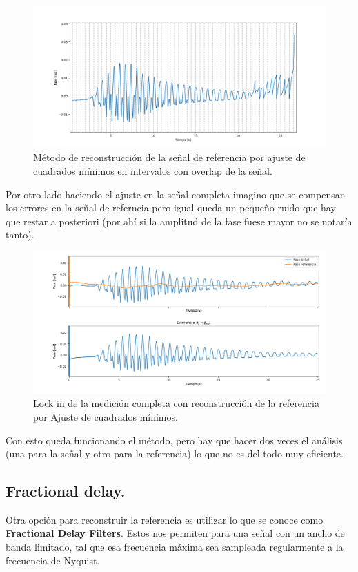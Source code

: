 \begin{figure}[th!]
	\centering
	\includegraphics[width=0.857\linewidth]{Figures/09_06_2025/Lock_in_ajuste_intervalos_con_overlap}
	\caption{Método de reconstrucción de la señal de referencia por ajuste de cuadrados mínimos en intervalos con overlap de la señal.}
	\label{fig:lockinajusteintervalosconoverlap}
\end{figure}

Por otro lado haciendo el ajuste en la señal completa imagino que se compensan los errores en la señal de referncia pero igual queda un pequeño ruido que hay que restar a posteriori (por ahí si la amplitud de la fase fuese mayor no se notaría tanto).

\begin{figure}[th!]
	\centering
	\includegraphics[width=0.987\linewidth]{Figures/09_06_2025/Lock_in_ajuste_completo}
	\caption{Lock in de la medición completa con reconstrucción de la referencia por Ajuste de cuadrados mínimos.}
	\label{fig:lockinajustecompleto}
\end{figure}

Con esto queda funcionando el método, pero hay que hacer dos veces el análisis (una para la señal y otro para la referencia) lo que no es del todo muy eficiente.


\subsection*{Fractional delay.} 
Otra opción para reconstruir la referencia es utilizar lo que se conoce como \textbf{Fractional Delay Filters}. Estos nos permiten para una señal con un ancho de banda limitado, tal que esa frecuencia máxima sea sampleada regularmente a la frecuencia de Nyquist. \cite{roelandtsHowCreateFractionalDelay2019}

